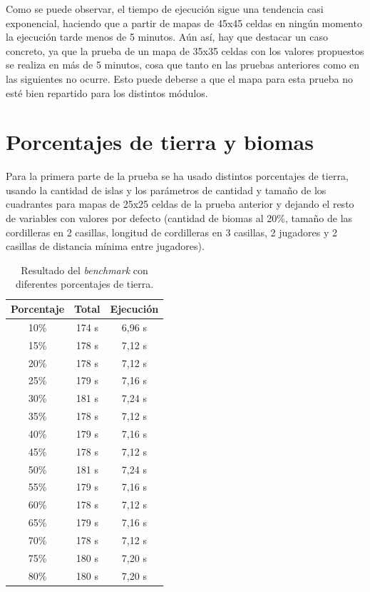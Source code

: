 Como se puede observar, el tiempo de ejecución sigue una tendencia casi exponencial, haciendo que a partir de mapas de 45x45 celdas en ningún momento la ejecución tarde menos de 5 minutos. Aún así, hay que destacar un caso concreto, ya que la prueba de un mapa de 35x35 celdas con los valores propuestos se realiza en más de 5 minutos, cosa que tanto en las pruebas anteriores como en las siguientes no ocurre. Esto puede deberse a que el mapa para esta prueba no esté bien repartido para los distintos módulos.  

\section{Porcentajes de tierra y biomas}
\label{sec:pruebatierrabiomas}

Para la primera parte de la prueba se ha usado distintos porcentajes de tierra, usando la cantidad de islas y los parámetros de cantidad y tamaño de los cuadrantes para mapas de 25x25 celdas de la prueba anterior y dejando el resto de variables con valores por defecto (cantidad de biomas al 20\%, tamaño de las cordilleras en 2 casillas, longitud de cordilleras en 3 casillas, 2 jugadores y 2 casillas de distancia mínima entre jugadores). \\

\begin{table}[!h]
	\centering
	\begin{tabular}{ c c c }
		\bfseries{Porcentaje} & \bfseries{Total} & \bfseries{Ejecución} \\
		\hline
		10\% & 174 s & 6,96 s \\
		15\% & 178 s & 7,12 s \\
		20\% & 178 s & 7,12 s \\
		25\% & 179 s & 7,16 s \\
		30\% & 181 s & 7,24 s \\
		35\% & 178 s & 7,12 s \\
		40\% & 179 s & 7,16 s \\
		45\% & 178 s & 7,12 s \\
		50\% & 181 s & 7,24 s \\
		55\% & 179 s & 7,16 s \\
		60\% & 178 s & 7,12 s \\
		65\% & 179 s & 7,16 s \\
		70\% & 178 s & 7,12 s \\
		75\% & 180 s & 7,20 s \\
		80\% & 180 s & 7,20 s \\
		\hline
	\end{tabular}
	\caption{Resultado del \textit{benchmark} con diferentes porcentajes de tierra.}\label{table:landresult}
\end{table}


